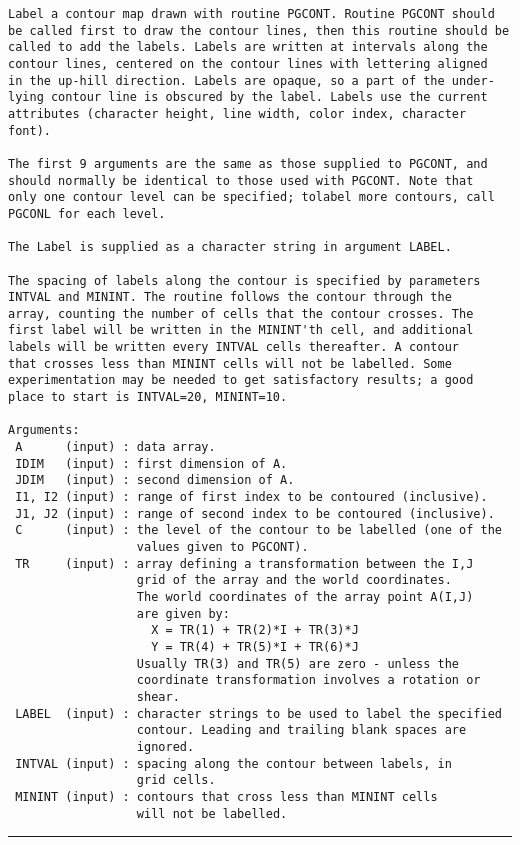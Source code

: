 {\begin{verbatim}
Label a contour map drawn with routine PGCONT. Routine PGCONT should
be called first to draw the contour lines, then this routine should be
called to add the labels. Labels are written at intervals along the
contour lines, centered on the contour lines with lettering aligned
in the up-hill direction. Labels are opaque, so a part of the under-
lying contour line is obscured by the label. Labels use the current
attributes (character height, line width, color index, character
font).

The first 9 arguments are the same as those supplied to PGCONT, and
should normally be identical to those used with PGCONT. Note that
only one contour level can be specified; tolabel more contours, call
PGCONL for each level.

The Label is supplied as a character string in argument LABEL.

The spacing of labels along the contour is specified by parameters
INTVAL and MININT. The routine follows the contour through the
array, counting the number of cells that the contour crosses. The
first label will be written in the MININT'th cell, and additional
labels will be written every INTVAL cells thereafter. A contour
that crosses less than MININT cells will not be labelled. Some
experimentation may be needed to get satisfactory results; a good
place to start is INTVAL=20, MININT=10.

Arguments:
 A      (input) : data array.
 IDIM   (input) : first dimension of A.
 JDIM   (input) : second dimension of A.
 I1, I2 (input) : range of first index to be contoured (inclusive).
 J1, J2 (input) : range of second index to be contoured (inclusive).
 C      (input) : the level of the contour to be labelled (one of the
                  values given to PGCONT).
 TR     (input) : array defining a transformation between the I,J
                  grid of the array and the world coordinates.
                  The world coordinates of the array point A(I,J)
                  are given by:
                    X = TR(1) + TR(2)*I + TR(3)*J
                    Y = TR(4) + TR(5)*I + TR(6)*J
                  Usually TR(3) and TR(5) are zero - unless the
                  coordinate transformation involves a rotation or
                  shear.
 LABEL  (input) : character strings to be used to label the specified
                  contour. Leading and trailing blank spaces are
                  ignored.
 INTVAL (input) : spacing along the contour between labels, in
                  grid cells.
 MININT (input) : contours that cross less than MININT cells
                  will not be labelled.
\end{verbatim}
\hrule


}

